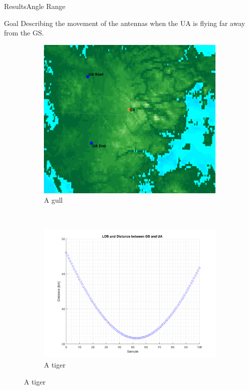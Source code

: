 \begin{frame}{Results}{Angle Range}

  \begin{block}{Goal}
	Describing the movement of the antennas when the UA is flying far away from the GS. 
  \end{block}
 
  \begin{figure}
    \centering
    \begin{subfigure}[b]{0.3\textwidth}
        \includegraphics[width=2\textwidth]{figures/s1_zoom.png}
        \caption{A gull}
        \label{fig:gull}
    \end{subfigure}
    ~ 
    \begin{subfigure}[b]{0.3\textwidth}
        \includegraphics[width=2\textwidth]{figures/s1_los.png}
        \caption{A tiger}
        \label{fig:tiger}
    \end{subfigure}
\end{figure} 
 
 
  
\end{frame}